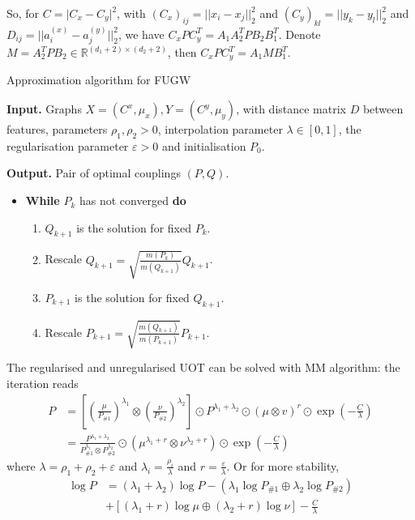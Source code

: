 \documentclass{article}
\theoremstyle{remark}
\begin{document}
So, for $C = \vert C_x - C_y \vert^2$, with $(C_x)_{ij} = \vert\vert x_i - x_j \vert\vert_2^2$ and 
$(C_y)_{kl} = \vert\vert y_k - y_l \vert\vert_2^2$ and 
$D_{ij} = \vert\vert a^{(x)}_i - a^{(y)}_j \vert\vert_2^2$, we have
$C_x P C_y^T = A_1 A_2^T P B_2 B_1^T$. Denote $M = A_2^T P B_2 \in \mathbb R^{(d_1+2) \times (d_2+2)}$, then $C_x P C_y^T = A_1 M B_1^T$.
\begin{algorithm}[H]
    \caption{Approximation algorithm for FUGW}
    \textbf{Input.} Graphs $X = (C^x, \mu_x), Y = (C^y, \mu_y)$, with distance matrix $D$ between features, parameters $\rho_1, \rho_2 > 0$, interpolation parameter $\lambda \in [0,1]$, 
    the regularisation parameter $\varepsilon > 0$ and initialisation $P_0$.
  
    \textbf{Output.} Pair of optimal couplings $(P,Q)$.
    \begin{itemize}
      \item \textbf{While} $P_k$ has not converged \textbf{do}
      \begin{enumerate}
        \item $Q_{k+1}$ is the solution for fixed $P_k$.
        \item Rescale $Q_{k+1} = \sqrt{\frac{m(P_k)}{m(Q_{k+1})}} Q_{k+1}$.

        \item $P_{k+1}$ is the solution for fixed $Q_{k+1}$.

        \item Rescale $P_{k+1} = \sqrt{\frac{m(Q_{k+1})}{m(P_{k+1})}} P_{k+1}$.
      \end{enumerate}
    \end{itemize}
    \label{algo:algo1}
\end{algorithm}
The regularised and unregularised UOT can be solved with MM algorithm: the iteration reads
\begin{equation}
    \begin{split}
        P &= \left[ \left( \frac{\mu}{P_{\# 1}}\right)^{\lambda_1} \otimes \left( \frac{\nu}{P_{\# 2}}\right)^{\lambda_2} \right] \odot 
    P^{\lambda_1 + \lambda_2} \odot (\mu \otimes v)^r \odot \exp\left(-\frac{C}{\lambda} \right) \\
    &= \frac{P^{\lambda_1 + \lambda_2}}{P_{\# 1}^{\lambda_1} \otimes P_{\# 2}^{\lambda_2}} 
    \odot \left( \mu^{\lambda_1 + r} \otimes \nu^{\lambda_2 + r} \right) 
    \odot \exp\left(-\frac{C}{\lambda} \right)
    \end{split}
\end{equation}
where $\lambda = \rho_1 + \rho_2 + \varepsilon$ and 
$\lambda_i = \frac{\rho_i}{\lambda}$ and $r = \frac{\varepsilon}{\lambda}$. Or for more stability, 
\begin{equation}
    \begin{split}
        \log P &= (\lambda_1 + \lambda_2) \log P - (\lambda_1 \log P_{\# 1} \oplus \lambda_2 \log P_{\# 2}) \\
        &+ \left[ (\lambda_1 + r) \log \mu \oplus (\lambda_2 + r) \log \nu \right] -\frac{C}{\lambda}
    \end{split}
\end{equation}
\end{document}
